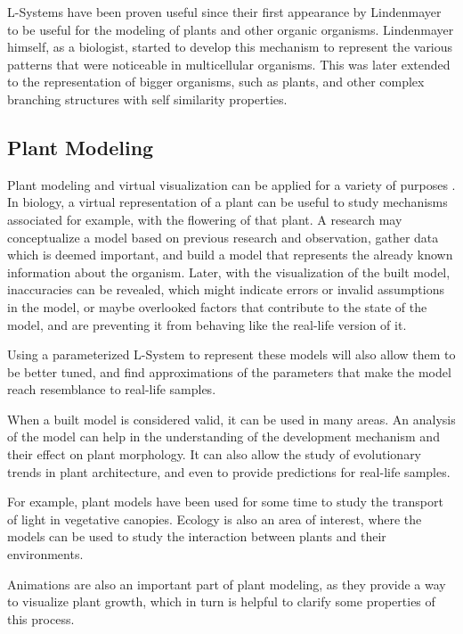 \documentclass{acmtog}
\begin{document}
L-Systems have been proven useful since their first appearance by Lindenmayer to be useful for the modeling of plants and other organic organisms. Lindenmayer himself, as a biologist, started to develop this mechanism to represent the various patterns that were noticeable in multicellular organisms. This was later extended to the representation of bigger organisms, such as plants, and other complex branching structures with self similarity properties.

\subsection{Plant Modeling}
\label{subsec:plant_modeling}

Plant modeling and virtual visualization can be applied for a variety of purposes \cite{hanan1992parametric}. In biology, a virtual representation of a plant can be useful to study mechanisms associated for example, with the flowering of that plant. A research may conceptualize a model based on previous research and observation, gather data which is deemed important, and build a model that represents the already known information about the organism. Later, with the visualization of the built model, inaccuracies can be revealed, which might indicate errors or invalid assumptions in the model, or maybe overlooked factors that contribute to the state of the model, and are preventing it from behaving like the real-life version of it.

Using a parameterized L-System to represent these models will also allow them to be better tuned, and find approximations of the parameters that make the model reach resemblance to real-life samples.

When a built model is considered valid, it can be used in many areas. An analysis of the model can help in the understanding of the development mechanism and their effect on plant morphology. It can also allow the study of evolutionary trends in plant architecture, and even to provide predictions for real-life samples.

For example, plant models have been used for some time to study the transport of light in vegetative canopies. Ecology is also an area of interest, where the models can be used to study the interaction between plants and their environments.

Animations are also an important part of plant modeling, as they provide a way to visualize plant growth, which in turn is helpful to clarify some properties of this process.
\end{document}
